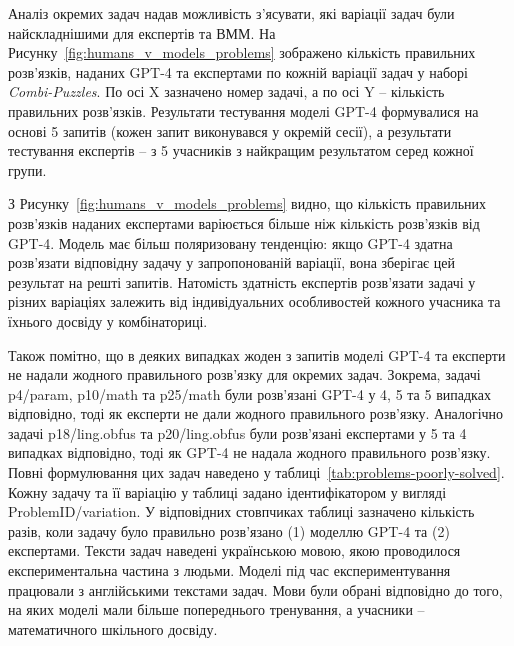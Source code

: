 Аналіз окремих задач надав можливість з’ясувати, які варіації задач були найскладнішими для експертів та ВММ. На Рисунку~\ref{fig:humans_v_models_problems} зображено кількість правильних розв’язків, наданих GPT-4 та експертами по кожній варіації задач у наборі \emph{Combi-Puzzles}. По осі X зазначено номер задачі, а по осі Y -- кількість правильних розв’язків. Результати тестування моделі GPT-4 формувалися на основі 5 запитів (кожен запит виконувався у окремій сесії), а результати тестування експертів -- з 5 учасників з найкращим результатом серед кожної групи.

З Рисунку~\ref{fig:humans_v_models_problems} видно, що кількість правильних розв’язків наданих експертами варіюється більше ніж кількість розв’язків від GPT-4. Модель має більш поляризовану тенденцію: якщо GPT-4 здатна розв’язати відповідну задачу у запропонованій варіації, вона зберігає цей результат на решті запитів. Натомість здатність експертів розв’язати задачі у різних варіаціях залежить від індивідуальних особливостей кожного учасника та їхнього досвіду у комбінаториці.

Також помітно, що в деяких випадках жоден з запитів моделі GPT-4 та експерти не надали жодного правильного розв’язку для окремих задач. Зокрема, задачі p4/param, p10/math та p25/math були розв’язані GPT-4 у 4, 5 та 5 випадках відповідно, тоді як експерти не дали жодного правильного розв’язку. Аналогічно задачі p18/ling.obfus та p20/ling.obfus були розв’язані експертами у 5 та 4 випадках відповідно, тоді як GPT-4 не надала жодного правильного розв’язку. Повні формулювання цих задач наведено у таблиці~\ref{tab:problems-poorly-solved}. Кожну задачу та її варіацію у таблиці задано ідентифікатором у вигляді ProblemID/variation. У відповідних стовпчиках таблиці зазначено кількість разів, коли задачу було правильно розв'язано (1) моделлю GPT-4 та (2) експертами. Тексти задач наведені українською мовою, якою проводилося експериментальна частина з людьми. Моделі під час експериментування працювали з англійськими текстами задач. Мови були обрані відповідно до того, на яких моделі мали більше попереднього тренування, а учасники -- математичного шкільного досвіду.

